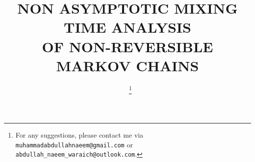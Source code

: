 \documentclass[preprint]{imsart}
\theoremstyle{plain}
\theoremstyle{definition}
\begin{document}
\begin{frontmatter}
\title{NON ASYMPTOTIC MIXING TIME ANALYSIS \\  OF NON-REVERSIBLE MARKOV CHAINS}



\author{~%
  \thanks{For any suggestions, please contact me via 
  \texttt{muhammadabdullahnaeem@gmail.com} or 
  \texttt{abdullah\_naeem\_waraich@outlook.com}.}}



\end{frontmatter}
\end{document}
